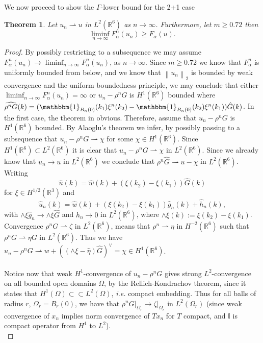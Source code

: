\documentclass[a4paper,11pt]{article}
\newcommand{\norm}[1]{\left\lVert #1 \right\rVert}
\newcommand{\ie}{\emph{i.e.} }
\newcommand{\R}{\mathbb{R}}
\newtheorem{theorem}{Theorem}
\numberwithin{equation}{section}
\begin{document}
	We now proceed to show the $ \Gamma $-lower bound for the 2+1 case\begin{theorem}
		Let $ u_n\rightharpoonup u $ in $ L^2(\R^6) $ as $ n\to\infty $. Furthermore, let $ m\geq0.72 $ then \begin{equation}
		\liminf_{n\to\infty}F^n_\alpha(u_n)\geq F_\alpha(u).
		\end{equation}
	\end{theorem}
	\begin{proof}
		By possibly restricting to a subsequence we may assume $ F^n_\alpha(u_n)\to\liminf_{n\to\infty}F_\alpha^n(u_n) $, as $ n\to\infty $. Since $ m\geq0.72 $ we know that $ F^n_\alpha $ is uniformly bounded from below, and we know that $ \norm{u_n}_2 $ is bounded by weak convergence and the uniform boundedness principle, we may conclude that either $ \liminf_{n\to\infty}F^n_\alpha(u_n)=\infty $ or $ u_n-\rho^nG $ is $ H^1(\R^6) $ bounded where $ \widehat{\rho^nG}(k)=(\mathbbm{1}_{B_n(0)}(k_1)\xi^n(k_2)-\mathbbm{1}_{B_n(0)}(k_2)\xi^n(k_1))\hat{G}(k) $. In the first case, the theorem in obvious. Therefore, assume that $ u_n-\rho^nG $ is $ H^1(\R^6) $ bounded. By Alaoglu's theorem we infer, by possibly passing to a subsequence that $ u_n-\rho^nG\rightharpoonup \chi $ for some $ \chi\in H^1(\R^6) $. Since $ H^1(\R^6)\subset L^2(\R^6) $ it is clear that $ u_n-\rho^nG\rightharpoonup \chi $ in $ L^2(\R^6) $. Since we already know that $ u_n\to u $ in $ L^2(\R^6) $ we conclude that $ \rho^n\hat{G}\rightharpoonup u-\chi $ in $ L^2(\R^6) $. Writing \begin{equation}
		\hat{u}(k)=\hat{w}(k)+(\xi(k_2)-\xi(k_1))\hat{G}(k)
		\end{equation}
		for $ \xi\in H^{1/2}(\R^3) $ and \begin{equation}
		\hat{u}_n(k)=\hat{w}(k)+(\xi(k_2)-\xi(k_1))\hat{g}_n(k) +\hat{h}_n(k),
		\end{equation}
		with $ \wedge\xi\hat{g}_n\to\wedge\xi\hat{G} $ and $ h_n\to 0 $ in $ L^2(\R^6) $, where $ \wedge\xi(k):=\xi(k_2)-\xi(k_1) $.\\
		Convergence $ \rho^nG\rightharpoonup \zeta $ in $ L^2(\R^6) $, means that $ \rho^n\rightharpoonup \eta $ in $ H^{-2}(\R^6) $ such that $ \rho^nG\rightharpoonup \eta G $ in $ L^2(\R^6) $. Thus we have $ u_n-\rho^nG\rightharpoonup w+((\wedge\xi-\hat{\eta})\hat{G})^\vee=\chi\in H^1(\R^6) $.\\
		\\
		Notice now that weak $ H^1 $-convergence of $ u_n-\rho^nG $ gives strong $ L^2 $-convergence on all bounded open domains $ \Omega $, by the Rellich-Kondrachov theorem, since it states that $ H^1(\Omega)\subset\subset L^2(\Omega) $, \ie compact embedding. Thus for all balls of radius $ r $, $ \Omega_r=B_r(0) $, we have that $ \rho^nG\rvert_{\Omega_r}\to \zeta\rvert_{\Omega_r} $ in $ L^2(\Omega_r) $ (since weak convergence of $ x_n $ implies norm convergence of $ Tx_n $ for $ T $ compact, and $ \mathbb{I} $ is compact operator from $ H^1 $ to $ L^2 $). \\

\end{proof}
\end{document}
